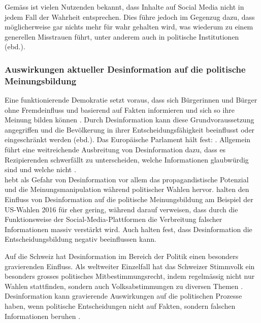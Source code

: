 \documentclass[12pt,a4paper]{article}        %
\begin{document}
Gemäss \textcite[183]{weidner_fake_2019} ist vielen Nutzenden bekannt, dass Inhalte auf Social Media nicht in jedem Fall der Wahrheit entsprechen. Dies führe jedoch im Gegenzug dazu, dass möglicherweise gar nichts mehr für wahr gehalten wird, was wiederum zu einem generellen Misstrauen führt, unter anderem auch in politische Institutionen (ebd.). 

\subsubsection{Auswirkungen aktueller Desinformation auf die politische Meinungsbildung}
Eine funktionierende Demokratie setzt voraus, dass sich Bürgerinnen und Bürger ohne Fremdeinfluss und basierend auf Fakten informieren und sich so ihre Meinung bilden können \parencite[26]{vogler_wahrnehmung_2021}. Durch Desinformation kann diese Grundvoraussetzung angegriffen und die Bevölkerung in ihrer Entscheidungsfähigkeit beeinflusst oder eingeschränkt werden (ebd.). 
Das Europäische Parlament hält fest:  \parencite[13]{european_parliament_directorate-general_for_external_policies_of_the_union_impact_2021} \parencites[vgl.\ auch][16]{reuter_fake_2019}[26]{vogler_wahrnehmung_2021}[19]{grujic_warnhinweise_2024}{schmidt_meinungsbildung_2022}. Allgemein führt eine weitreichende Ausbreitung von Desinformation dazu, dass es Rezipierenden schwerfällt zu unterscheiden, welche Informationen glaubwürdig sind und welche nicht \parencite[3697]{weikmann_visual_2023}.\\
\Textcite[170]{wahl_fake_2021} hebt als Gefahr von Desinformation vor allem das propagandistische Potenzial und die Meinungsmanipulation während politischer Wahlen hervor. \textcite{allcott_social_2017} halten den Einfluss von Desinformation auf die politische Meinungsbildung am Beispiel der US-Wahlen 2016 für eher gering, während \textcite[1095]{lazer_science_2018} darauf verweisen, dass durch die Funktionsweise der Social-Media-Plattformen die Verbreitung falscher Informationen massiv verstärkt wird. Auch \textcite[26]{vogler_wahrnehmung_2021} halten fest, dass Desinformation die Entscheidungsbildung negativ beeinflussen kann.

Auf die Schweiz hat Desinformation im Bereich der Politik einen besonders gravierenden Einfluss. Als weltweiter Einzelfall hat das Schweizer Stimmvolk ein besonders grosses politisches Mitbestimmungsrecht, indem regelmässig nicht nur Wahlen stattfinden, sondern auch Volksabstimmungen zu diversen Themen \parencite[2]{sager_politische_2017}. Desinformation kann gravierende Auswirkungen auf die politischen Prozesse haben, wenn politische Entscheidungen nicht auf Fakten, sondern falschen Informationen beruhen \parencites[26]{vogler_wahrnehmung_2021}[vgl.\ auch][19]{grujic_warnhinweise_2024}.
\end{document}
